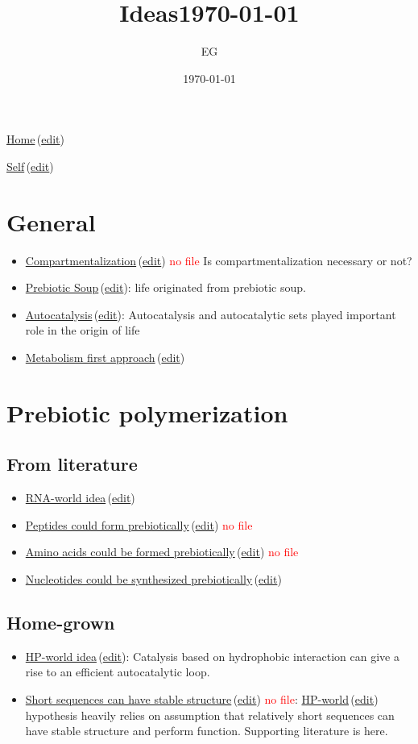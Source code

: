 \documentclass[12pt]{paper}
\title{Ideas\today}
\author{EG}
\date{\today}
\newcommand{\red}[1]{\textcolor{red}{#1}}
\newcommand{\wikilink}[2] { \href{#1.pdf}{#2}\,(\href{#1.tex}{edit})}
\begin{document}
 \maketitle
\wikilink{home}{Home}

\wikilink{ideas}{Self}
 
\tableofcontents


\section{General}
\begin{itemize}
 \item \wikilink{compartment}{Compartmentalization} \red{no file} Is compartmentalization 
necessary or not?
\item \wikilink{prebiotic\_soup}{Prebiotic Soup}: life originated from prebiotic soup.
\item \wikilink{autocatalysis}{Autocatalysis}: Autocatalysis and autocatalytic sets played 
important role in the origin of life
\item \wikilink{metabolism}{Metabolism first approach}
\end{itemize}


\section{Prebiotic polymerization}
\subsection{From literature}
\begin{itemize}
\item \wikilink{rna\_world}{RNA-world idea}
 \item  \wikilink{peptide\_world}{Peptides could form prebiotically} \red{no file}
 \item \wikilink{prebiotic\_aa}{Amino acids could be formed prebiotically} \red{no file}
 \item \wikilink{prebiotic\_nucleotides}{Nucleotides could be synthesized prebiotically}
\end{itemize}

\subsection{Home-grown}
\begin{itemize}
 \item \wikilink{hp\_world\_thesis}{HP-world idea}: Catalysis based on hydrophobic interaction can 
give a rise to an efficient 
autocatalytic loop.
\item \wikilink{short\_able\_sequences}{Short sequences can have stable structure} \red{no file}: 
\wikilink{hp\_world\_thesis}{HP-world}  hypothesis heavily relies on 
assumption that relatively short sequences can have stable structure and perform function. 
Supporting literature is here. 
\end{itemize}
\end{document}
